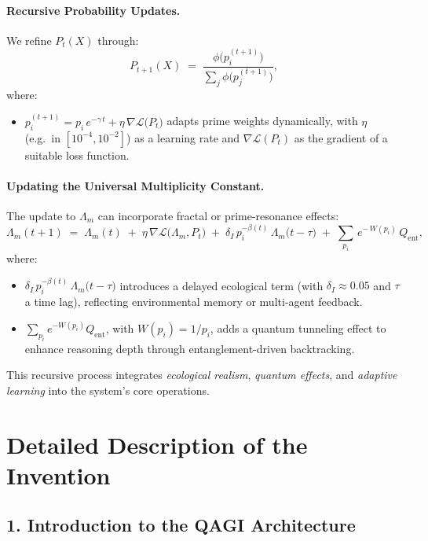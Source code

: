 \documentclass{article}
\theoremstyle{plain}
\theoremstyle{claimstyle}
\begin{document}
\paragraph{Recursive Probability Updates.}
We refine $P_t(X)$ through:
\begin{equation}
P_{t+1}(X)
\;=\;
\frac{\phi\!\bigl(p_i^{(t+1)}\bigr)}{\sum_j \phi\!\bigl(p_j^{(t+1)}\bigr)},
\end{equation}
where:
\begin{itemize}
    \item $p_i^{(t+1)} = p_i\,e^{-\gamma\,t} + \eta\,\nabla\mathcal{L}\bigl(P_t\bigr)$ adapts prime weights dynamically, with $\eta$ (e.g.\ in $[10^{-4},10^{-2}]$) as a learning rate and $\nabla\mathcal{L}(P_t)$ as the gradient of a suitable loss function.
\end{itemize}

\paragraph{Updating the Universal Multiplicity Constant.}
The update to $\Lambda_m$ can incorporate fractal or prime-resonance effects:
\begin{equation}
\Lambda_m(t+1)
\;=\;
\Lambda_m(t)
\;+\;
\eta\,\nabla \mathcal{L}\bigl(\Lambda_m,P_t\bigr)
\;+\;
\delta_I\,p_i^{-\beta(t)}\,\Lambda_m\bigl(t - \tau\bigr)
\;+\;
\sum_{p_i}\,e^{-\,W(p_i)}\,Q_{\text{ent}},
\end{equation}
where:
\begin{itemize}
    \item $\delta_I\,p_i^{-\beta(t)}\,\Lambda_m\!\bigl(t-\tau\bigr)$ introduces a delayed ecological term (with $\delta_I \approx 0.05$ and $\tau$ a time lag), reflecting environmental memory or multi-agent feedback.
    \item $\sum_{p_i} e^{-W(p_i)} Q_{\text{ent}}$, with $W(p_i)=1/p_i$, adds a quantum tunneling effect to enhance reasoning depth through entanglement-driven backtracking. 
\end{itemize}
This recursive process integrates \emph{ecological realism}, \emph{quantum effects}, and \emph{adaptive learning} into the system’s core operations.



\section*{Detailed Description of the Invention}

\subsection*{1. Introduction to the QAGI Architecture}
\end{document}
